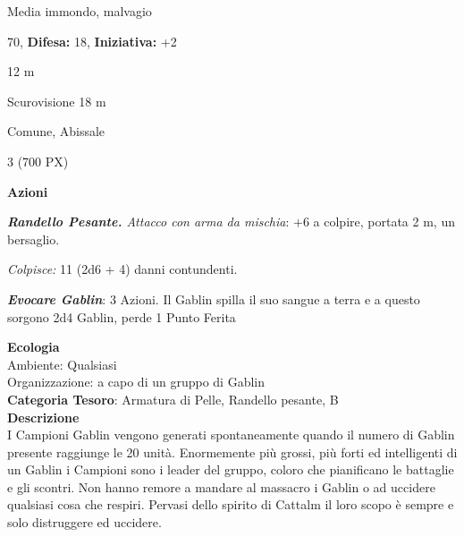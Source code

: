 \begin{multicols}{2}
{
\noindent
\begin{description}[noitemsep, topsep=0pt, parsep=0pt, partopsep=0pt, leftmargin=0cm, labelwidth=2.2cm]
	\item[\textbf{Taglia/Tipo:}] Media immondo, malvagio
	\item[\textbf{Caratt.:}] 
	\item[\textbf{Punti Ferita:}] 70,  \textbf{Difesa:} 18,  \textbf{Iniziativa:} +2
	\item[\textbf{Movimento:}] 12 m
	\item[\textbf{Tiri Salvez.:}] 
	\item[\textbf{Sensi:}] Scurovisione 18 m
	\item[\textbf{Linguaggi:}] Comune, Abissale
	\item[\textbf{Sfida:}] 3 (700 PX)\smallskip
\end{description}

\textbf{Azioni}

\emph{\textbf{Randello Pesante.} Attacco con arma da mischia}: +6 a colpire, portata 2 m, un bersaglio.

\emph{Colpisce:} 11 (2d6 + 4) danni contundenti.

\emph{\textbf{Evocare Gablin}}: 3 Azioni. Il Gablin spilla il suo sangue a terra e a questo sorgono 2d4 Gablin, perde 1 Punto Ferita

\textbf{Ecologia}\\
Ambiente: Qualsiasi\\
Organizzazione: a capo di un gruppo di Gablin\\
\textbf{Categoria Tesoro}: Armatura di Pelle, Randello pesante, B\\
\textbf{Descrizione}\\
I Campioni Gablin vengono generati spontaneamente quando il numero di Gablin presente raggiunge le 20 unità. Enormemente più grossi, più forti ed intelligenti di un Gablin i Campioni sono i leader del gruppo, coloro che pianificano le battaglie e gli scontri.
Non hanno remore a mandare al massacro i Gablin o ad uccidere qualsiasi cosa che respiri. Pervasi dello spirito di Cattalm il loro scopo è sempre e solo distruggere ed uccidere.

}
\end{multicols}
